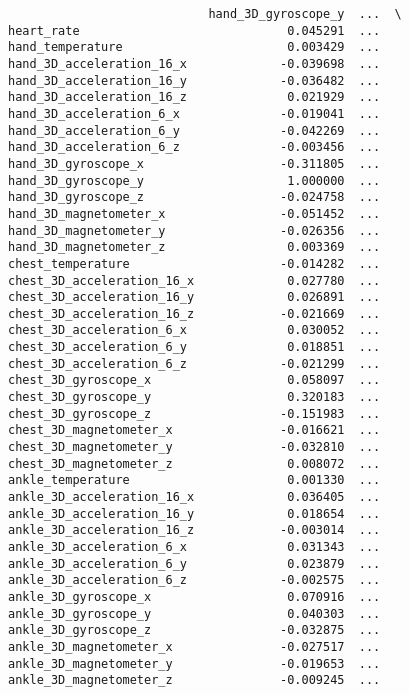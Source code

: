 \documentclass[11pt]{article}
\begin{document}
\begin{verbatim}
                            hand_3D_gyroscope_y  ...  \
heart_rate                             0.045291  ...   
hand_temperature                       0.003429  ...   
hand_3D_acceleration_16_x             -0.039698  ...   
hand_3D_acceleration_16_y             -0.036482  ...   
hand_3D_acceleration_16_z              0.021929  ...   
hand_3D_acceleration_6_x              -0.019041  ...   
hand_3D_acceleration_6_y              -0.042269  ...   
hand_3D_acceleration_6_z              -0.003456  ...   
hand_3D_gyroscope_x                   -0.311805  ...   
hand_3D_gyroscope_y                    1.000000  ...   
hand_3D_gyroscope_z                   -0.024758  ...   
hand_3D_magnetometer_x                -0.051452  ...   
hand_3D_magnetometer_y                -0.026356  ...   
hand_3D_magnetometer_z                 0.003369  ...   
chest_temperature                     -0.014282  ...   
chest_3D_acceleration_16_x             0.027780  ...   
chest_3D_acceleration_16_y             0.026891  ...   
chest_3D_acceleration_16_z            -0.021669  ...   
chest_3D_acceleration_6_x              0.030052  ...   
chest_3D_acceleration_6_y              0.018851  ...   
chest_3D_acceleration_6_z             -0.021299  ...   
chest_3D_gyroscope_x                   0.058097  ...   
chest_3D_gyroscope_y                   0.320183  ...   
chest_3D_gyroscope_z                  -0.151983  ...   
chest_3D_magnetometer_x               -0.016621  ...   
chest_3D_magnetometer_y               -0.032810  ...   
chest_3D_magnetometer_z                0.008072  ...   
ankle_temperature                      0.001330  ...   
ankle_3D_acceleration_16_x             0.036405  ...   
ankle_3D_acceleration_16_y             0.018654  ...   
ankle_3D_acceleration_16_z            -0.003014  ...   
ankle_3D_acceleration_6_x              0.031343  ...   
ankle_3D_acceleration_6_y              0.023879  ...   
ankle_3D_acceleration_6_z             -0.002575  ...   
ankle_3D_gyroscope_x                   0.070916  ...   
ankle_3D_gyroscope_y                   0.040303  ...   
ankle_3D_gyroscope_z                  -0.032875  ...   
ankle_3D_magnetometer_x               -0.027517  ...   
ankle_3D_magnetometer_y               -0.019653  ...   
ankle_3D_magnetometer_z               -0.009245  ...   


\end{verbatim}
\end{document}

